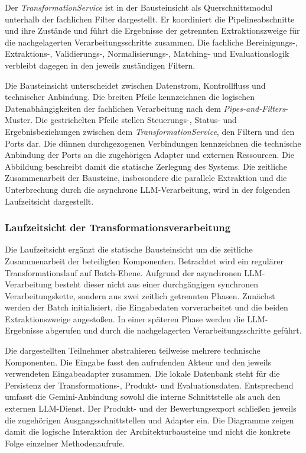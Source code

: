 Der \textit{TransformationService} ist in der Bausteinsicht als Querschnittsmodul unterhalb der fachlichen Filter dargestellt. Er koordiniert die Pipelineabschnitte und ihre 
Zustände und führt die Ergebnisse der getrennten Extraktionszweige für die nachgelagerten Verarbeitungsschritte zusammen. Die fachliche Bereinigungs-, Extraktions-, 
Validierungs-, Normalisierungs-, Matching- und Evaluationslogik verbleibt dagegen in den jeweils zuständigen Filtern.

Die Bausteinsicht unterscheidet zwischen Datenstrom, Kontrollfluss und technischer Anbindung. Die breiten Pfeile kennzeichnen die logischen Datenabhängigkeiten der fachlichen 
Verarbeitung nach dem \textit{Pipes-and-Filters}-Muster. Die gestrichelten Pfeile stellen Steuerungs-, Status- und Ergebnisbeziehungen zwischen dem 
\textit{TransformationService}, den Filtern und den Ports dar. Die dünnen durchgezogenen Verbindungen kennzeichnen die technische Anbindung der Ports an die zugehörigen 
Adapter und externen Ressourcen. Die Abbildung beschreibt damit die statische Zerlegung des Systems. Die zeitliche Zusammenarbeit der Bausteine, insbesondere die parallele 
Extraktion und die Unterbrechung durch die asynchrone LLM-Verarbeitung, wird in der folgenden Laufzeitsicht dargestellt.

\subsubsection{Laufzeitsicht der Transformationsverarbeitung}

Die Laufzeitsicht ergänzt die statische Bausteinsicht um die zeitliche Zusammenarbeit der beteiligten Komponenten. Betrachtet wird ein regulärer Transformationslauf auf 
Batch-Ebene. Aufgrund der asynchronen LLM-Verarbeitung besteht dieser nicht aus einer durchgängigen synchronen Verarbeitungskette, sondern aus zwei zeitlich getrennten Phasen.
 Zunächst werden der Batch initialisiert, die Eingabedaten vorverarbeitet und die beiden Extraktionszweige angestoßen. In einer späteren Phase werden die LLM-Ergebnisse 
 abgerufen und durch die nachgelagerten Verarbeitungsschritte geführt.

Die dargestellten Teilnehmer abstrahieren teilweise mehrere technische Komponenten. Die Eingabe fasst den aufrufenden Akteur und den jeweils verwendeten Eingabeadapter 
zusammen. Die lokale Datenbank steht für die Persistenz der Transformations-, Produkt- und Evaluationsdaten. Entsprechend umfasst die Gemini-Anbindung sowohl die interne 
Schnittstelle als auch den externen LLM-Dienst. Der Produkt- und der Bewertungsexport schließen jeweils die zugehörigen Ausgangsschnittstellen und Adapter ein. Die Diagramme 
zeigen damit die logische Interaktion der Architekturbausteine und nicht die konkrete Folge einzelner Methodenaufrufe.


